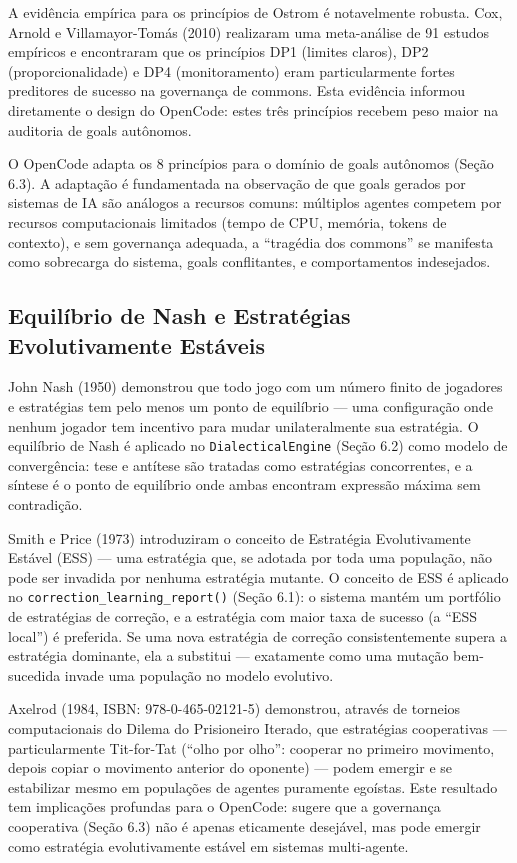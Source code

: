 A evidência empírica para os princípios de Ostrom é notavelmente robusta. Cox, Arnold e Villamayor-Tomás (2010) realizaram uma meta-análise de 91 estudos empíricos e encontraram que os princípios DP1 (limites claros), DP2 (proporcionalidade) e DP4 (monitoramento) eram particularmente fortes preditores de sucesso na governança de commons. Esta evidência informou diretamente o design do OpenCode: estes três princípios recebem peso maior na auditoria de goals autônomos.

O OpenCode adapta os 8 princípios para o domínio de goals autônomos (Seção 6.3). A adaptação é fundamentada na observação de que goals gerados por sistemas de IA são análogos a recursos comuns: múltiplos agentes competem por recursos computacionais limitados (tempo de CPU, memória, tokens de contexto), e sem governança adequada, a ``tragédia dos commons'' se manifesta como sobrecarga do sistema, goals conflitantes, e comportamentos indesejados.

\subsection{Equilíbrio de Nash e Estratégias Evolutivamente Estáveis}

John Nash (1950)  demonstrou que todo jogo com um número finito de jogadores e estratégias tem pelo menos um ponto de equilíbrio — uma configuração onde nenhum jogador tem incentivo para mudar unilateralmente sua estratégia. O equilíbrio de Nash é aplicado no \texttt{DialecticalEngine} (Seção 6.2) como modelo de convergência: tese e antítese são tratadas como estratégias concorrentes, e a síntese é o ponto de equilíbrio onde ambas encontram expressão máxima sem contradição.

Smith e Price (1973)  introduziram o conceito de Estratégia Evolutivamente Estável (ESS) — uma estratégia que, se adotada por toda uma população, não pode ser invadida por nenhuma estratégia mutante. O conceito de ESS é aplicado no \texttt{correction\_learning\_report()} (Seção 6.1): o sistema mantém um portfólio de estratégias de correção, e a estratégia com maior taxa de sucesso (a ``ESS local'') é preferida. Se uma nova estratégia de correção consistentemente supera a estratégia dominante, ela a substitui — exatamente como uma mutação bem-sucedida invade uma população no modelo evolutivo.

Axelrod (1984, ISBN: 978-0-465-02121-5) demonstrou, através de torneios computacionais do Dilema do Prisioneiro Iterado, que estratégias cooperativas — particularmente Tit-for-Tat (``olho por olho'': cooperar no primeiro movimento, depois copiar o movimento anterior do oponente) — podem emergir e se estabilizar mesmo em populações de agentes puramente egoístas. Este resultado tem implicações profundas para o OpenCode: sugere que a governança cooperativa (Seção 6.3) não é apenas eticamente desejável, mas pode emergir como estratégia evolutivamente estável em sistemas multi-agente.

